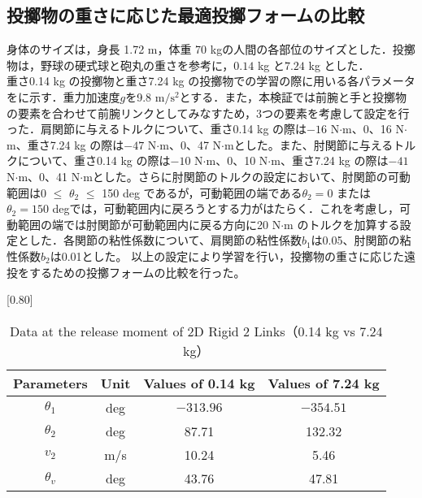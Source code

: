 \begin{small}
\subsection{投擲物の重さに応じた最適投擲フォームの比較}
身体のサイズは，身長 1.72 m，体重 70 kgの人間の各部位のサイズとした．投擲物は，野球の硬式球と砲丸の重さを参考に，$0.14$ kg\cite{horiuchi} と$7.24$ kg\cite{haq} とした．\\
重さ0.14 kg の投擲物と重さ7.24 kg の投擲物での学習の際に用いる各パラメータをに示す\cite{irving}．重力加速度$g$を9.8 $\mathrm{m/s^{2}}$とする．また，本検証では前腕と手と投擲物の要素を合わせて前腕リンクとしてみなすため，3つの要素を考慮して設定を行った．肩関節に与えるトルクについて、重さ0.14 kg の際は$-16$ N$\cdot$m、0、16 N$\cdot$m、重さ7.24 kg の際は$-47$ N$\cdot$m、0、47 N$\cdot$mとした。また、肘関節に与えるトルクについて、重さ0.14 kg の際は$-10$ N$\cdot$m、0、10 N$\cdot$m、重さ7.24 kg の際は$-41$ N$\cdot$m、0、41 N$\cdot$mとした。さらに肘関節のトルクの設定において、肘関節の可動範囲は0 $\le$ $\theta_{2}$ $\le$ 150 deg であるが，可動範囲の端である$\theta_{2} = 0$ または $\theta_{2} = 150$ degでは，可動範囲内に戻ろうとする力がはたらく．これを考慮し，可動範囲の端では肘関節が可動範囲内に戻る方向に20 N$\cdot$m のトルクを加算する設定とした．各関節の粘性係数について、肩関節の粘性係数$b_{1}$は0.05、肘関節の粘性係数$b_{2}$は0.01とした。
以上の設定により学習を行い，投擲物の重さに応じた遠投をするための投擲フォームの比較を行った。
\begin{table}[h]
  \begin{center}
    \caption{Data at the release moment of 2D Rigid 2 Links（0.14 kg vs 7.24 kg）}
    \scalebox{0.80}[0.80]{
    \begin{tabular}{c|c|c|c}
      \hline
      Parameters & Unit & Values of 0.14 kg & Values of 7.24 kg \\
      \hline
      $\theta_{1}$ & deg & $-313.96$ & $-354.51$ \\
      $\theta_{2}$ & deg & 87.71 & 132.32 \\
      $v_{2}$ & m/s & 10.24 & 5.46 \\
      $\theta_{v}$ & deg & 43.76 & 47.81 \\
      \hline
    \end{tabular}
    }
  \end{center}
\end{table}

\end{small}
